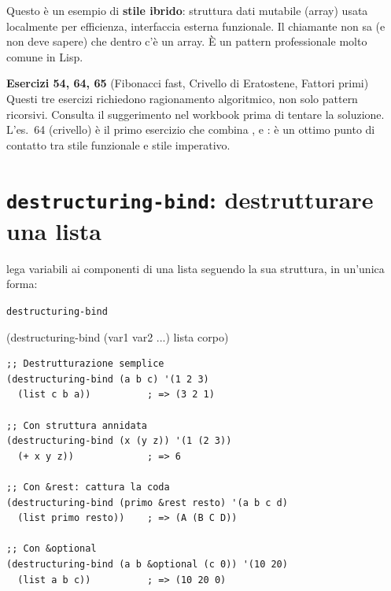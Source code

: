 \begin{nota}
Questo è un esempio di \textbf{stile ibrido}: struttura dati mutabile
(array) usata localmente per efficienza, interfaccia esterna funzionale.
Il chiamante non sa (e non deve sapere) che dentro c'è un array.
È un pattern professionale molto comune in Lisp.
\end{nota}

\begin{workbook}
\textbf{Esercizi 54, 64, 65}
(Fibonacci fast, Crivello di Eratostene, Fattori primi)\\[4pt]
Questi tre esercizi richiedono ragionamento algoritmico, non solo
pattern ricorsivi. Consulta il suggerimento nel workbook
prima di tentare la soluzione.\\[4pt]
L'es.~64 (crivello) è il primo esercizio che combina ,
 e : è un ottimo punto di contatto tra
stile funzionale e stile imperativo.
\end{workbook}

\section{\texttt{destructuring-bind}: destrutturare una lista}

 lega variabili ai componenti di una lista
seguendo la sua struttura, in un'unica forma:

\begin{concetto}{\texttt{destructuring-bind}}

\begin{sintassi}
(destructuring-bind (var1 var2 ...) lista corpo)
\end{sintassi}

\end{concetto}

\begin{esempio}
\begin{lstlisting}
;; Destrutturazione semplice
(destructuring-bind (a b c) '(1 2 3)
  (list c b a))          ; => (3 2 1)

;; Con struttura annidata
(destructuring-bind (x (y z)) '(1 (2 3))
  (+ x y z))             ; => 6

;; Con &rest: cattura la coda
(destructuring-bind (primo &rest resto) '(a b c d)
  (list primo resto))    ; => (A (B C D))

;; Con &optional
(destructuring-bind (a b &optional (c 0)) '(10 20)
  (list a b c))          ; => (10 20 0)
\end{lstlisting}
\end{esempio}


